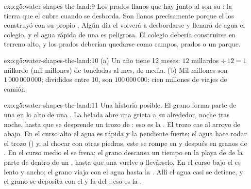 \begin{solution}{exo:g5:water-shapes-the-land:9}
Los prados llanos que hay junto al  son su : la
tierra que el  cubre cuando se desborda. Son llanos precisamente porque
el  los construyó con su propio . Algún día el  volverá a
desbordarse y llenará de agua el colegio, y el agua rápida de una 
es peligrosa. El colegio debería construirse en terreno alto, y los prados
deberían quedarse como campos, prados o un parque.
\end{solution}

\begin{solution}{exo:g5:water-shapes-the-land:10}
(a) Un año tiene 12 meses: $12$ millardos $\div\, 12 = 1$ millardo (mil
millones) de toneladas al mes, de media. (b) Mil millones son
$1\,000\,000\,000$; divididos entre 10, son $100\,000\,000$: cien millones
de viajes de camión.
\end{solution}

\begin{solution}{exo:g5:water-shapes-the-land:11}
Una historia posible. El grano forma parte de una  en lo alto de una
. La helada abre una grieta a su alrededor, noche tras noche, hasta
que se desprende un trozo de : eso es la . El trozo cae al
arroyo de abajo. En el curso alto el agua es rápida y la pendiente fuerte:
el agua hace rodar el trozo () y, al chocar con otras piedras, este
se rompe en  y después en granos de . En el curso medio el 
se frena; el grano descansa un tiempo en la playa de  de la parte de
dentro de un , hasta que una  vuelve a llevárselo. En el
curso bajo el  es lento y ancho; el grano viaja con el agua hasta la
. Allí el agua casi se detiene, y el grano se deposita con el
 y la  del : eso es la .
\end{solution}
